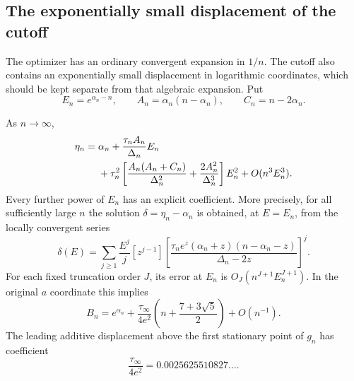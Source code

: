 \subsection{The exponentially small displacement of the cutoff}
The optimizer has an ordinary convergent expansion in $1/n$. The
cutoff also contains an exponentially small displacement in logarithmic
coordinates, which should be kept separate from that algebraic expansion.
Put
\[
 E_n=e^{\alpha_n-n},\qquad A_n=\alpha_n(n-\alpha_n),
 \qquad C_n=n-2\alpha_n.
\]

\begin{theorem}
\label{opt:thm:cutoff-expansion}
As $n\to\infty$,
\begin{align}
 \eta_n={}&\alpha_n+
 \frac{\tau_nA_n}{\Delta_n}E_n\notag\\
 &+\tau_n^2\left[
 \frac{A_n(A_n+C_n)}{\Delta_n^2}
 +\frac{2A_n^2}{\Delta_n^3}\right]E_n^2
 +O(n^3E_n^3).\label{opt:eq:eta-two-sectors}
\end{align}
Every further power of $E_n$ has an explicit coefficient. More precisely,
for all sufficiently large $n$ the solution $\delta=\eta_n-\alpha_n$
is obtained, at $E=E_n$, from the locally convergent series
\begin{equation}\label{opt:eq:eta-Lagrange}
 \delta(E)=\sum_{j\geq1}\frac{E^j}{j}[z^{j-1}]
 \left[
 \frac{\tau_ne^z(\alpha_n+z)(n-\alpha_n-z)}{\Delta_n-2z}
 \right]^j.
\end{equation}
For each fixed truncation order $J$, its error at $E_n$ is
$O_J(n^{J+1}E_n^{J+1})$.
In the original $a$ coordinate this implies
\begin{equation}\label{opt:eq:B-asymptotic}
 B_n=e^{\alpha_n}+
 \frac{\tau_\infty}{4e^2}
 \left(n+\frac{7+3\sqrt5}{2}\right)+O(n^{-1}).
\end{equation}
The leading additive displacement above the first stationary point
of $g_n$ has coefficient
\[
 \frac{\tau_\infty}{4e^2}=0.0025625510827\ldots.
\]
\end{theorem}
